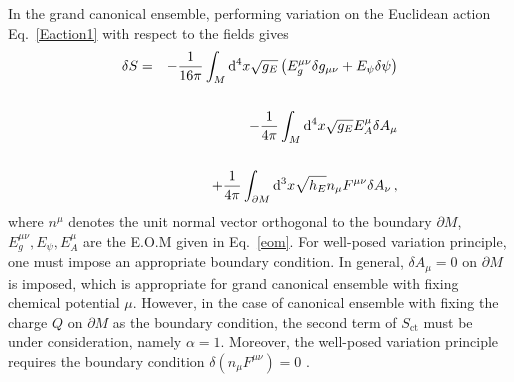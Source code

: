\documentclass[pr, twocolumn, preprintnumbers, showpacs,footnoteadded, superscriptaddress,nofootinbib,longbibliography]{revtex4-1}
\newcommand{\td}{\mathrm{d}}
\begin{document}
In the grand canonical ensemble, performing variation on the Euclidean action Eq.~\eqref{Eaction1} with respect to the fields gives
%
\begin{eqnarray}
\delta S  = &&-\frac{1}{16\pi} \int_{M} \td^4 x  \sqrt{g_E} \left (E_g^{\mu\nu}\delta g_{\mu\nu} + E_{\psi}\delta \psi \right) \cr
~\cr
&& -\frac{1}{4\pi}\int_{M} \td^4 x \sqrt{g_E} E_A^{\mu}\delta A_\mu   \cr
~\cr
&& + \frac{1}{4\pi}\int_{\partial M} \td^3 x \sqrt{h_E}n_\mu F^{\mu\nu}\delta A_\nu \, ,
\end{eqnarray}
%
where $n^\mu$ denotes the unit normal vector orthogonal to the boundary $\partial M$, $E_g^{\mu\nu}, E_\psi, E_A^\mu$ are the E.O.M given in Eq.~\eqref{eom}. For well-posed variation principle, one must impose an appropriate boundary condition. In general, $\delta A_{\mu}=0$ on $\partial M$ is imposed, which is appropriate for grand canonical ensemble with fixing chemical potential $\mu$. However, in the case of canonical ensemble with fixing the charge $Q$ on $\partial M$ as the boundary condition, the second term of $S_{\text{ct}}$ must be under consideration, namely $\alpha=1$. Moreover, the well-posed variation principle requires the boundary condition $\delta (n_\mu F^{\mu\nu})=0$ \cite{Hawking:1995ap,Caldarelli:1999xj}.
\end{document}
